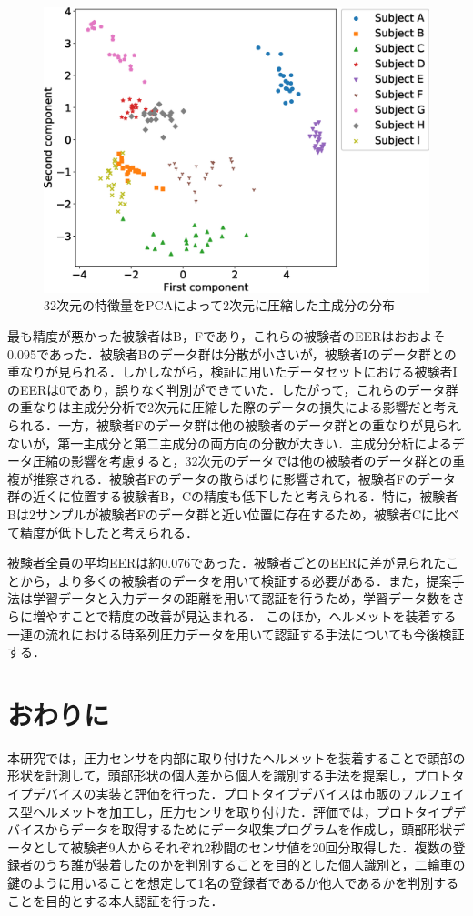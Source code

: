 \documentclass[Japanese,noauthor]{dicomopapers}
\begin{document}
\begin{figure}[!t]
  \centering
    \includegraphics[width=1\linewidth]{figure/PCA.eps}
  \caption{32次元の特徴量をPCAによって2次元に圧縮した主成分の分布}
  \label{PCA}
\end{figure}

最も精度が悪かった被験者はB，Fであり，これらの被験者のEERはおおよそ0.095であった．被験者Bのデータ群は分散が小さいが，被験者Iのデータ群との重なりが見られる．しかしながら，検証に用いたデータセットにおける被験者IのEERは0であり，誤りなく判別ができていた．したがって，これらのデータ群の重なりは主成分分析で2次元に圧縮した際のデータの損失による影響だと考えられる．一方，被験者Fのデータ群は他の被験者のデータ群との重なりが見られないが，第一主成分と第二主成分の両方向の分散が大きい．主成分分析によるデータ圧縮の影響を考慮すると，32次元のデータでは他の被験者のデータ群との重複が推察される．被験者Fのデータの散らばりに影響されて，被験者Fのデータ群の近くに位置する被験者B，Cの精度も低下したと考えられる．特に，被験者Bは2サンプルが被験者Fのデータ群と近い位置に存在するため，被験者Cに比べて精度が低下したと考えられる．\par

被験者全員の平均EERは約0.076であった．被験者ごとのEERに差が見られたことから，より多くの被験者のデータを用いて検証する必要がある．また，提案手法は学習データと入力データの距離を用いて認証を行うため，学習データ数をさらに増やすことで精度の改善が見込まれる．
このほか，ヘルメットを装着する一連の流れにおける時系列圧力データを用いて認証する手法についても今後検証する．

\section{おわりに}
\label{conclude}
本研究では，圧力センサを内部に取り付けたヘルメットを装着することで頭部の形状を計測して，頭部形状の個人差から個人を識別する手法を提案し，プロトタイプデバイスの実装と評価を行った．プロトタイプデバイスは市販のフルフェイス型ヘルメットを加工し，圧力センサを取り付けた．評価では，プロトタイプデバイスからデータを取得するためにデータ収集プログラムを作成し，頭部形状データとして被験者9人からそれぞれ2秒間のセンサ値を20回分取得した．複数の登録者のうち誰が装着したのかを判別することを目的とした個人識別と，二輪車の鍵のように用いることを想定して1名の登録者であるか他人であるかを判別することを目的とする本人認証を行った．
\end{document}
